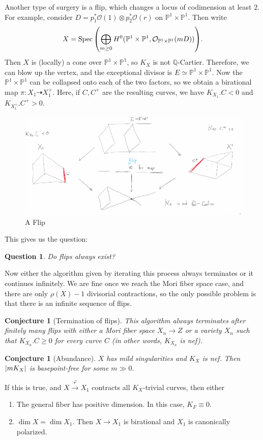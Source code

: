 \documentclass[leqno, openany]{memoir}
\newtheorem{conj}[thm]{Conjecture}
\newtheorem{quest}[thm]{Question}
\theoremstyle{definition}
\theoremstyle{remark}
\theoremstyle{plain}
\theoremstyle{definition}
\theoremstyle{remark}
\newcommand{\Q}{\mathbb{Q}}
\renewcommand{\P}{\mathbb{P}}
\newcommand{\mc}[1]{\mathcal{#1}}
\DeclareMathOperator{\Spec}{Spec}
\begin{document}
Another type of surgery is a flip, which changes a locus of codimension at least $2$. For example, consider $D = p_1^* \mc{O}(1) \otimes p_2^* \mc{O}(r)$ on $\P^1 \times \P^1$. Then write
\[ X = \Spec \qty(\bigoplus_{m \geq 0} H^0 (\P^1 \times \P^1, \mc{O}_{\P^1 \times \P^1}(mD))). \]
Then $X$ is (locally) a cone over $\P^1 \times \P^1$, so $K_X$ is not $\Q$-Cartier. Therefore, we can blow up the vertex, and the exceptional divisor is $E \simeq \P^1 \times \P^1$. Now the $\P^1 \times \P^1$ can be collapsed onto each of the two factors, so we obtain a birational map $\pi \colon X_1 \dashrightarrow X_1^+$. Here, if $C,C^+$ are the resulting curves, we have $K_{X_1}.C < 0$ and $K_{X_1^+}.C^+ > 0$.
\begin{figure}[H]
    \centering
    \includegraphics[width=0.8\linewidth]{flip}
    \caption{A Flip}%
    \label{fig:flip}
\end{figure}
This gives us the question:
\begin{quest}
    Do flips always exist?
\end{quest}
Now either the algorithm given by iterating this process always terminates or it continues infinitely. We are fine once we reach the Mori fiber space case, and there are only $\rho(X) - 1$ divisorial contractions, so the only possible problem is that there is an infinite sequence of flips.

\begin{conj}[Termination of flips]
    This algorithm always terminates after finitely many flips with either a Mori fiber space $X_n \to Z$ or a variety $X_n$ such that $K_{X_n}.C \geq 0$ for every curve $C$ (in other words, $K_{X_n}$ is nef).
\end{conj}

\begin{conj}[Abundance]
    $X$ has mild singularities and $K_X$ is nef. Then $\abs{m K_X}$ is basepoint-free for some $m \gg 0$.
\end{conj}

If this is true, and $X \xrightarrow{\varphi} X_1$ contracts all $K_X$-trivial curves, then either
\begin{enumerate}
    \item The general fiber has positive dimension. In this case, $K_F \equiv 0$.
    \item $\dim X = \dim X_1$. Then $X \to X_1$ is birational and $X_1$ is canonically polarized.
\end{enumerate}
\end{document}
